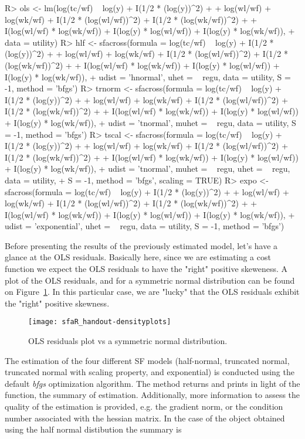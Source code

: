 \documentclass[nojss]{jss}
\begin{document}
\begin{Schunk}
\begin{Sinput}
R> ols <- lm(log(tc/wf) ~ log(y) + I(1/2 * (log(y))^2) +
+   log(wl/wf) + log(wk/wf) + I(1/2 * (log(wl/wf))^2) + I(1/2 * (log(wk/wf))^2) +
+   I(log(wl/wf) * log(wk/wf)) + I(log(y) * log(wl/wf)) + I(log(y) * log(wk/wf)), 
+   data = utility)
R> hlf <- sfacross(formula = log(tc/wf) ~ log(y) + I(1/2 * (log(y))^2) +
+   log(wl/wf) + log(wk/wf) + I(1/2 * (log(wl/wf))^2) + I(1/2 * (log(wk/wf))^2) +
+   I(log(wl/wf) * log(wk/wf)) + I(log(y) * log(wl/wf)) + I(log(y) * log(wk/wf)),
+   udist = 'hnormal', uhet = ~ regu, data = utility, S = -1, method = 'bfgs')
R> trnorm <- sfacross(formula = log(tc/wf) ~ log(y) + I(1/2 * (log(y))^2) +
+   log(wl/wf) + log(wk/wf) + I(1/2 * (log(wl/wf))^2) + I(1/2 * (log(wk/wf))^2) +
+   I(log(wl/wf) * log(wk/wf)) + I(log(y) * log(wl/wf)) + I(log(y) * log(wk/wf)),
+   udist = 'tnormal', muhet = ~ regu, data = utility, S = -1, method = 'bfgs')
R> tscal <- sfacross(formula = log(tc/wf) ~ log(y) + I(1/2 * (log(y))^2) +
+   log(wl/wf) + log(wk/wf) + I(1/2 * (log(wl/wf))^2) + I(1/2 * (log(wk/wf))^2) +
+   I(log(wl/wf) * log(wk/wf)) + I(log(y) * log(wl/wf)) + I(log(y) * log(wk/wf)),
+   udist = 'tnormal', muhet = ~ regu, uhet = ~ regu, data = utility, 
+   S = -1, method = 'bfgs', scaling = TRUE)
R> expo <- sfacross(formula = log(tc/wf) ~ log(y) + I(1/2 * (log(y))^2) +
+   log(wl/wf) + log(wk/wf) + I(1/2 * (log(wl/wf))^2) + I(1/2 * (log(wk/wf))^2) +
+   I(log(wl/wf) * log(wk/wf)) + I(log(y) * log(wl/wf)) + I(log(y) * log(wk/wf)),
+   udist = 'exponential', uhet = ~ regu, data = utility, S = -1, method = 'bfgs')
\end{Sinput}
\end{Schunk}

Before presenting the results of the previously estimated model, let's have a 
glance at the OLS residuals. Basically here, since we are estimating a cost 
function we expect the OLS residuals to have the "right" positive skeweness. 
A plot of the OLS residuals, and for a symmetric normal distribution can be 
found on Figure~\ref{fig:1}. In this particular case, we are "lucky" that the 
OLS residuals exhibit the "right" positive skewness.

\begin{figure}[t!]
\centering
\texttt{[image: sfaR\_handout-densityplots]}
\caption{\label{fig:1} OLS residuals plot vs a symmetric normal distribution.}
\end{figure}

The estimation of the four different SF models (half-normal, truncated normal, 
truncated normal with scaling property, and exponential) is conducted using the 
default \textit{bfgs} optimization algorithm. The  method returns
and prints in light of the  function, the summary of estimation. 
Additionally, more information to assess the quality of the estimation is 
provided, e.g. the gradient norm, or the condition number associated with the 
hessian matrix. In the case of the object obtained using the half normal 
distibution the summary is
\end{document}
